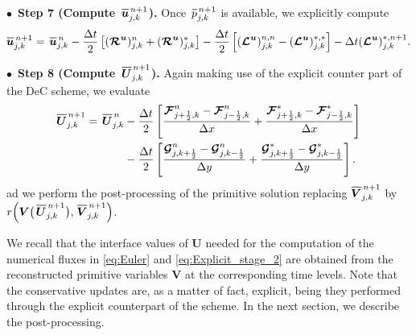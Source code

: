 \documentclass[A4paper,12pt,twoside]{article}
\numberwithin{equation}{section}
\numberwithin{figure}{section}
\numberwithin{table}{section}
\newcommand{\dt}{\Delta t}
\newcommand{\dx}{\Delta x}
\newcommand{\dy}{\Delta y}
\newcommand{\kph}{{k+\frac{1}{2}}}
\newcommand{\kmh}{{k-\frac{1}{2}}}
\newcommand{\jph}{{j+\frac{1}{2}}}
\newcommand{\jmh}{{j-\frac{1}{2}}}
\newcommand\eref[1]{(\ref{#1})}
\newcommand*\xbar[1]{%
  \hbox{%
    \vbox{%
      \hrule height 0.5pt %
      \kern0.4ex%
      \hbox{%
        \kern-0.05em%
        \ensuremath{#1}%
        \kern-0.00em%
      }%
    }%
  }%
}
\newcommand{\uvec}[2][3]{\boldsymbol{#2\mkern-#1mu}\mkern#1mu}
\newcommand{\lore}[1]{{\leavevmode\color{red} #1}}
\begin{document}
\smallskip
\noindent
$\bullet\,$ \textbf{Step 7 (Compute $\,\xbar{\bm u}^{\,n+1}_{j,k}$).} Once $\,\xbar p^{\,n+1}_{j,k}$ is available, we \lore{explicitly} compute
\begin{equation*}
\begin{aligned}
\xbar{\bm u}^{\,n+1}_{j,k}=
\,\xbar{\bm u}^{\,n}_{j,k}-\frac{\dt}{2}\left[(\bm{{\cal R}}^{\bm u})^n_{j,k}+(\bm{{\cal R}}^{\bm u})^*_{j,k}\right]
-\frac{\dt}{2}\left[(\bm{{\cal L}}^{\uvec{u}})^{n,n}_{j,k}-(\bm{{\cal L}}^{\uvec{u}})^{*,*}_{j,k}\right]-\dt(\bm{{\cal L}}^{\bm u})^{*,n+1}_{j,k}.
\end{aligned}
\end{equation*}


\smallskip
\noindent
$\bullet\,$ \textbf{Step 8 (Compute $\,\xbar{\bm U}^{\,n+1}_{j,k}$).} \lore{Again making use of the explicit counter part of the DeC scheme, we evaluate  
\begin{equation}
\begin{aligned}
\xbar{\bm U}^{\,n+1}_{j,k}=\,\xbar{\bm U}^{\,n}_{j,k}&-\frac{\dt}{2}\left[\frac{\bm{{\cal F}}_{\jph,k}^n-\bm{{\cal F}}_{\jmh,k}^n}{\dx}+
\frac{\bm{{\cal F}}_{\jph,k}^{*}-\bm{{\cal F}}_{\jmh,k}^{*}}{\dx}\right]\\
&-\frac{\dt}{2}\left[\frac{\bm{{\cal G}}_{j,\kph}^n-\bm{{\cal G}}_{j,\kmh}^n}{\dy}+
\frac{\bm{{\cal G}}_{j,\kph}^{*}-\bm{{\cal G}}_{j,\kmh}^{*}}{\dy}\right].
\end{aligned}
\label{eq:Explicit_stage_2}
\end{equation}
ad we perform the post-processing of the primitive solution replacing $\xbar{\bm V}^{\,n+1}_{j,k}$ by  $r\Big(\bm V\big(\,\xbar{\bm U}^{\,n+1}_{j,k}\big),\,\xbar{\bm V}^{\,n+1}_{j,k}\Big)$.}







\lore{We recall that the interface values of $\bm U$ needed for the computation of the numerical fluxes in \eqref{eq:Euler} and \eqref{eq:Explicit_stage_2} are obtained from the
reconstructed primitive variables $\bm V$ at the corresponding time levels. Note that the conservative updates are, as a matter of
fact, explicit, being they performed through the explicit counterpart of the scheme. In the next section, we describe the post-processing.}
\end{document}
